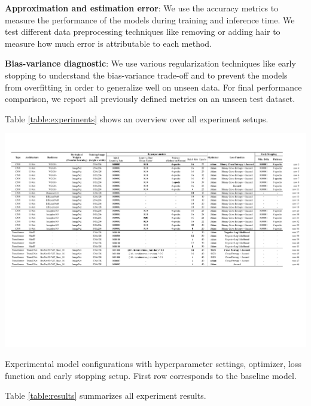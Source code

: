 \textbf{Approximation and estimation error}: We use the accuracy metrics to measure the performance of the models during training and inference time. We test different data preprocessing techniques like removing or adding hair to measure how much error is attributable to each method.

\textbf{Bias-variance diagnostic}: We use various regularization techniques like early stopping to understand the bias-variance trade-off and to prevent the models from overfitting in order to generalize well on unseen data. For final performance comparison, we report all previously defined metrics on an unseen test dataset.

\par
Table \ref{table:experiments} shows an overview over all experiment setups.

\begin{table}[ht]
  \centering
  \includegraphics[width=\textwidth]{assets/experiments.pdf}
  \caption[Experiments]{Experimental model configurations with hyperparameter settings, optimizer, loss function and early stopping setup. First row corresponds to the baseline model.}
  \label{table:experiments}
\end{table}

\par
Table \ref{table:results} summarizes all experiment results.

